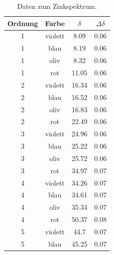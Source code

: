 \documentclass[]{article}
\begin{document}
\begin{table}[H]
\centering
\begin{tabular}{|c|c|c|c|}
\hline
Ordnung & Farbe & $\delta$ & $\Delta\delta$ \\ \hline\hline
1 & violett & 8.09 & 0.06 \\ \hline
1 & blau & 8.19 & 0.06 \\ \hline
1 & oliv & 8.32 & 0.06 \\ \hline
1 & rot & 11.05 & 0.06 \\ \hline
2 & violett & 16.34 & 0.06 \\ \hline
2 & blau & 16.52 & 0.06 \\ \hline
2 & oliv & 16.83 & 0.06 \\ \hline
2 & rot & 22.49 & 0.06 \\ \hline
3 & violett & 24.96 & 0.06 \\ \hline
3 & blau & 25.22 & 0.06 \\ \hline
3 & oliv & 25.72 & 0.06 \\ \hline
3 & rot & 34.97 & 0.07 \\ \hline
4 & violett & 34.26 & 0.07 \\ \hline
4 & blau & 34.61 & 0.07 \\ \hline
4 & oliv & 35.34 & 0.07 \\ \hline
4 & rot & 50.37 & 0.08 \\ \hline
5 & violett & 44.7 & 0.07 \\ \hline
5 & blau & 45.25 & 0.07 \\ \hline
\hline
\end{tabular}
\caption{Daten zum Zinkspektrum.\label{Zn Data}}
\end{table}
\end{document}
